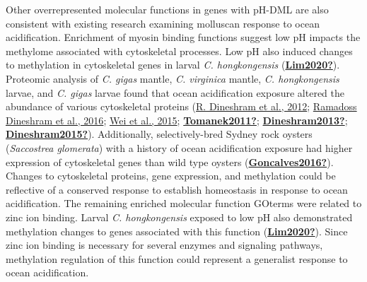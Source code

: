 \documentclass [11pt, proquest] {uwthesis}[2015/03/03]
\begin{document}
Other overrepresented molecular functions in genes with pH-DML are also consistent with existing research examining molluscan response to ocean acidification. Enrichment of myosin binding functions suggest low pH impacts the methylome associated with cytoskeletal processes. Low pH also induced changes to methylation in cytoskeletal genes in larval \emph{C. hongkongensis} (\protect\hyperlink{ref-Lim2020}{\textbf{Lim2020?}}). Proteomic analysis of \emph{C. gigas} mantle, \emph{C. virginica} mantle, \emph{C. hongkongensis} larvae, and \emph{C. gigas} larvae found that ocean acidification exposure altered the abundance of various cytoskeletal proteins (\protect\hyperlink{ref-Dineshram2012}{R. Dineshram et al., 2012}; \protect\hyperlink{ref-Dineshram2016}{Ramadoss Dineshram et al., 2016}; \protect\hyperlink{ref-Wei2015}{Wei et al., 2015}; \protect\hyperlink{ref-Tomanek2011}{\textbf{Tomanek2011?}}; \protect\hyperlink{ref-Dineshram2013}{\textbf{Dineshram2013?}}; \protect\hyperlink{ref-Dineshram2015}{\textbf{Dineshram2015?}}). Additionally, selectively-bred Sydney rock oysters (\emph{Saccostrea glomerata}) with a history of ocean acidification exposure had higher expression of cytoskeletal genes than wild type oysters (\protect\hyperlink{ref-Goncalves2016}{\textbf{Goncalves2016?}}). Changes to cytoskeletal proteins, gene expression, and methylation could be reflective of a conserved response to establish homeostasis in response to ocean acidification. The remaining enriched molecular function GOterms were related to zinc ion binding. Larval \emph{C. hongkongensis} exposed to low pH also demonstrated methylation changes to genes associated with this function (\protect\hyperlink{ref-Lim2020}{\textbf{Lim2020?}}). Since zinc ion binding is necessary for several enzymes and signaling pathways, methylation regulation of this function could represent a generalist response to ocean acidification.
\end{document}
